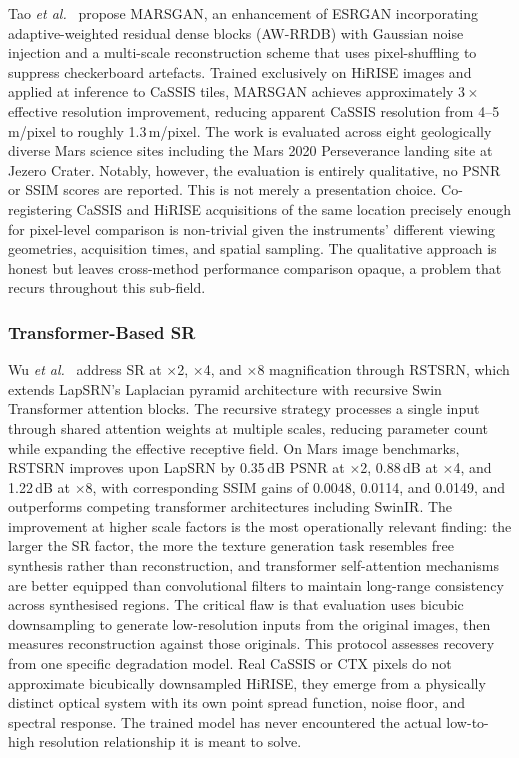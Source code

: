 \documentclass[10pt,journal]{IEEEtran}
\begin{document}
Tao \textit{et al.}~\cite{tao2021cassis} propose MARSGAN, an enhancement of
ESRGAN incorporating adaptive-weighted residual dense blocks (AW-RRDB) with
Gaussian noise injection and a multi-scale reconstruction scheme that uses
pixel-shuffling to suppress checkerboard artefacts. Trained exclusively on
HiRISE images and applied at inference to CaSSIS tiles, MARSGAN achieves
approximately $3\times$ effective resolution improvement, reducing apparent CaSSIS
resolution from 4--5\,m/pixel to roughly 1.3\,m/pixel. The work is evaluated
across eight geologically diverse Mars science sites including the Mars 2020
Perseverance landing site at Jezero Crater. Notably, however, the evaluation is
entirely qualitative, no PSNR or SSIM scores are reported. This is not merely a
presentation choice. Co-registering CaSSIS and HiRISE acquisitions of the same
location precisely enough for pixel-level comparison is non-trivial given the
instruments' different viewing geometries, acquisition times, and spatial
sampling. The qualitative approach is honest but leaves cross-method performance
comparison opaque, a problem that recurs throughout this sub-field.

\subsubsection{Transformer-Based SR}

Wu \textit{et al.}~\cite{wu2024rstsrn} address SR at $\times$2, $\times$4, and
$\times$8 magnification through RSTSRN, which extends LapSRN's Laplacian
pyramid architecture with recursive Swin Transformer attention blocks.
The recursive strategy processes a single input through shared attention weights
at multiple scales, reducing parameter count while expanding the effective
receptive field. On Mars image benchmarks, RSTSRN improves upon LapSRN by
0.35\,dB PSNR at $\times$2, 0.88\,dB at $\times$4, and 1.22\,dB at $\times$8,
with corresponding SSIM gains of 0.0048, 0.0114, and 0.0149, and outperforms
competing transformer architectures including SwinIR. The improvement at higher
scale factors is the most operationally relevant finding: the larger the SR
factor, the more the texture generation task resembles free synthesis rather than
reconstruction, and transformer self-attention mechanisms are better equipped
than convolutional filters to maintain long-range consistency across
synthesised regions. The critical flaw is that evaluation uses bicubic
downsampling to generate low-resolution inputs from the original images, then
measures reconstruction against those originals. This protocol assesses recovery
from one specific degradation model. Real CaSSIS or CTX pixels do not
approximate bicubically downsampled HiRISE, they emerge from a physically
distinct optical system with its own point spread function, noise floor, and
spectral response. The trained model has never encountered the actual low-to-high
resolution relationship it is meant to solve.
\end{document}
